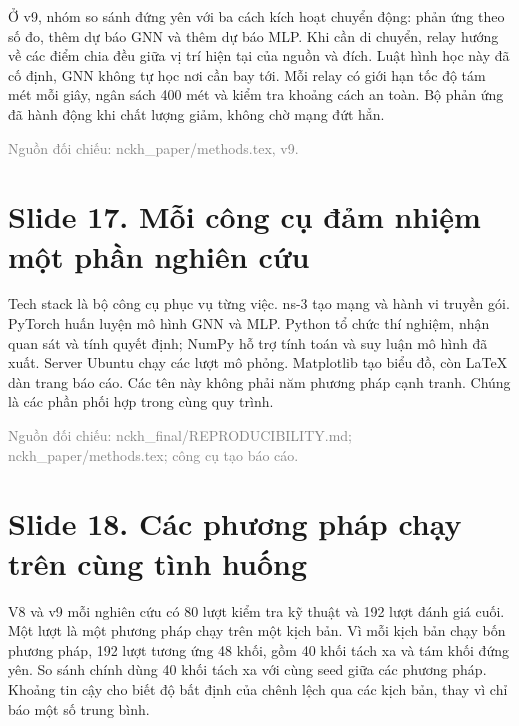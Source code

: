 Ở v9, nhóm so sánh đứng yên với ba cách kích hoạt chuyển động: phản ứng theo số đo, thêm dự báo GNN và thêm dự báo MLP. Khi cần di chuyển, relay hướng về các điểm chia đều giữa vị trí hiện tại của nguồn và đích. Luật hình học này đã cố định, GNN không tự học nơi cần bay tới. Mỗi relay có giới hạn tốc độ tám mét mỗi giây, ngân sách 400 mét và kiểm tra khoảng cách an toàn. Bộ phản ứng đã hành động khi chất lượng giảm, không chờ mạng đứt hẳn.

{\small\textcolor{gray}{Nguồn đối chiếu: nckh\_paper/methods.tex, v9.}}




\section*{Slide 17. Mỗi công cụ đảm nhiệm một phần nghiên cứu}


Tech stack là bộ công cụ phục vụ từng việc. ns-3 tạo mạng và hành vi truyền gói. PyTorch huấn luyện mô hình GNN và MLP. Python tổ chức thí nghiệm, nhận quan sát và tính quyết định; NumPy hỗ trợ tính toán và suy luận mô hình đã xuất. Server Ubuntu chạy các lượt mô phỏng. Matplotlib tạo biểu đồ, còn LaTeX dàn trang báo cáo. Các tên này không phải năm phương pháp cạnh tranh. Chúng là các phần phối hợp trong cùng quy trình.

{\small\textcolor{gray}{Nguồn đối chiếu: nckh\_final/REPRODUCIBILITY.md; nckh\_paper/methods.tex; công cụ tạo báo cáo.}}




\section*{Slide 18. Các phương pháp chạy trên cùng tình huống}


V8 và v9 mỗi nghiên cứu có 80 lượt kiểm tra kỹ thuật và 192 lượt đánh giá cuối. Một lượt là một phương pháp chạy trên một kịch bản. Vì mỗi kịch bản chạy bốn phương pháp, 192 lượt tương ứng 48 khối, gồm 40 khối tách xa và tám khối đứng yên. So sánh chính dùng 40 khối tách xa với cùng seed giữa các phương pháp. Khoảng tin cậy cho biết độ bất định của chênh lệch qua các kịch bản, thay vì chỉ báo một số trung bình.


